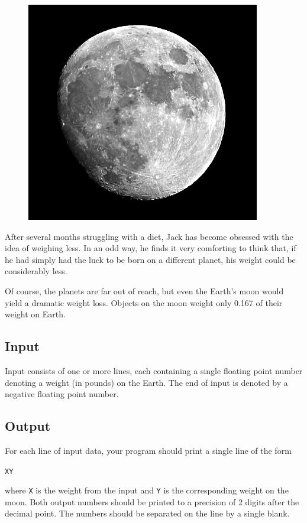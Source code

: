 
\begin{figure}
\includegraphics[width=\linewidth]{moon/moon_2.png}
\end{figure}
After several months struggling with a diet, Jack has become obsessed
with the idea of weighing less. In an odd way, he finds it very
comforting to think that, if he had simply had the luck to be born on
a different planet, his weight could be considerably less.

Of course, the planets are far out of reach, but even the Earth's moon
would yield a dramatic weight loss. Objects on the moon weight only
0.167 of their weight on Earth.

\subsection*{Input}

Input consists of one or more lines, each containing a single floating
point number denoting a weight (in pounds) on the Earth. The end of
input is denoted by a negative floating point number.


\subsection*{Output}

For each line of input data, your program should print a single line
of the form
\begin{alltt}
X Y
\end{alltt}
where \texttt{X} is the weight from the input and \texttt{Y} is the
corresponding weight on the moon. Both output numbers should be
printed to a precision of 2 digits after the decimal point. The
numbers should be separated on the line by a single blank.

